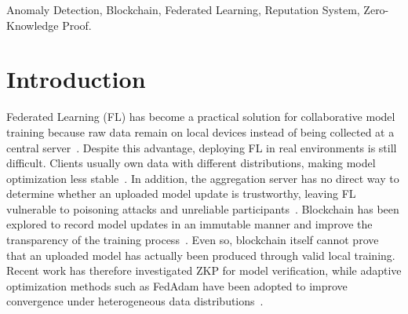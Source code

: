\documentclass[conference, a4paper]{IEEEtran}
\begin{document}
\maketitle

\begin{abstract}
Federated Learning (FL) enables collaborative model training while preserving data privacy but remains susceptible to malicious updates and heterogeneous data distributions. This paper presents a blockchain-enabled FL framework that combines Zero-Knowledge Proof (ZKP), smart contracts, InterPlanetary File System (IPFS), and a reputation-aware anomaly detection mechanism for trustworthy model verification and aggregation. FedProx is employed to stabilize local training under Non-IID data, whereas FedAdam adaptively aggregates verified updates. Model updates are validated using ZKP, stored off-chain in IPFS, and managed on-chain through blockchain-based smart contracts. Experiments on the EMNIST Balanced benchmark (47 classes) under IID and Non-IID settings achieve final top-1 accuracies of 75.2\% and 71.2\%, respectively, with client Groth16 proof generation overhead below 3.5\% and average reputation scores above 0.76. Furthermore, comparative analysis and baseline ablation demonstrate that the framework reliably maintains convergence under Byzantine attacks where standard FL baselines collapse.
\end{abstract}

\begin{IEEEkeywords}
Anomaly Detection, Blockchain, Federated Learning, Reputation System, Zero-Knowledge Proof.
\end{IEEEkeywords}


\section{Introduction}\label{Introduction}

Federated Learning (FL) has become a practical solution for collaborative model training because raw data remain on local devices instead of being collected at a central server~\cite{mcmahan2016communication}. Despite this advantage, deploying FL in real environments is still difficult. Clients usually own data with different distributions, making model optimization less stable~\cite{li2020federated}. In addition, the aggregation server has no direct way to determine whether an uploaded model update is trustworthy, leaving FL vulnerable to poisoning attacks and unreliable participants~\cite{nair2025incentivized,xia2023poisoning}. Blockchain has been explored to record model updates in an immutable manner and improve the transparency of the training process~\cite{wang2023blockchain,goh2023blockchain}. Even so, blockchain itself cannot prove that an uploaded model has actually been produced through valid local training. Recent work has therefore investigated ZKP for model verification, while adaptive optimization methods such as FedAdam have been adopted to improve convergence under heterogeneous data distributions~\cite{ma2024vpfl,ebrahimi2024blockchain,wang2025zkfl,bellachia2025verifbfl,reddi2021adaptive}.
\end{document}
